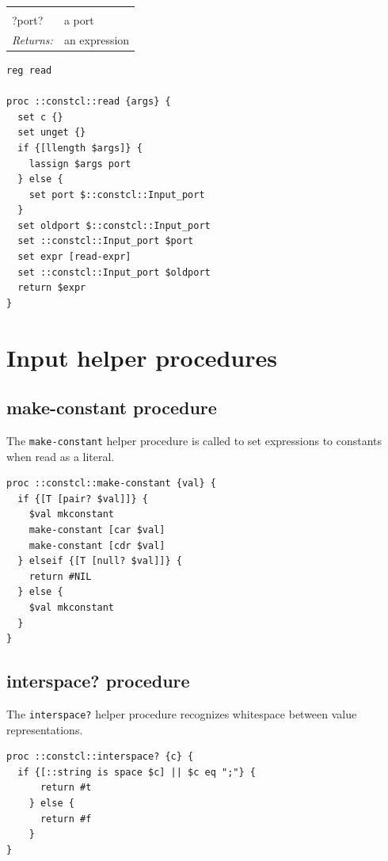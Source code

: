 \documentclass[twoside,9pt]{report}
\begin{document}
\noindent\begin{tabular}{ |p{1.9cm} p{8cm}| }
\hline
\rowcolor[HTML]{CCCCCC} \multicolumn{2}{|l|}{\bf read (public)} \\
?port? & a port \\
\textit{Returns:} & an expression \\
\hline
\end{tabular}
\begin{lstlisting}
reg read

proc ::constcl::read {args} {
  set c {}
  set unget {}
  if {[llength $args]} {
    lassign $args port
  } else {
    set port $::constcl::Input_port
  }
  set oldport $::constcl::Input_port
  set ::constcl::Input_port $port
  set expr [read-expr]
  set ::constcl::Input_port $oldport
  return $expr
}
\end{lstlisting}
\section{Input helper procedures}
\label{input-helper-procedures}
\subsection{make-constant procedure}
\label{make-constant-procedure}


The \texttt{make-constant} helper procedure is called to set expressions to constants when read as a literal.

\begin{lstlisting}
proc ::constcl::make-constant {val} {
  if {[T [pair? $val]]} {
    $val mkconstant
    make-constant [car $val]
    make-constant [cdr $val]
  } elseif {[T [null? $val]]} {
    return #NIL
  } else {
    $val mkconstant
  }
}
\end{lstlisting}
\subsection{interspace? procedure}
\label{interspace?-procedure}


The \texttt{interspace?} helper procedure recognizes whitespace between value representations.

\begin{lstlisting}
proc ::constcl::interspace? {c} {
  if {[::string is space $c] || $c eq ";"} {
      return #t
    } else {
      return #f
    }
}
\end{lstlisting}
\end{document}
